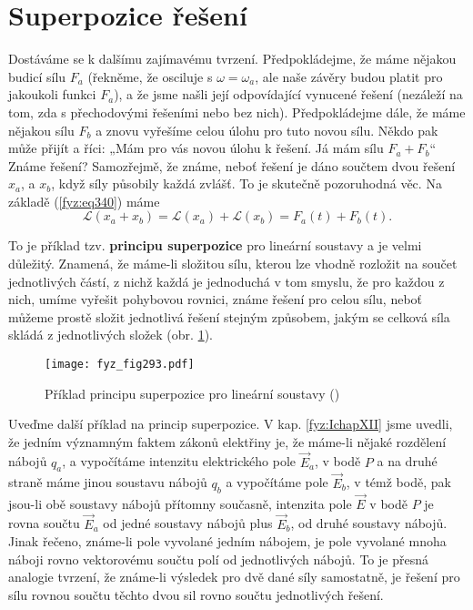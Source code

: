  \section{Superpozice řešení}\label{fyz:IchapXXVsecII}
    Dostáváme se k dalšímu zajímavému tvrzení. Předpokládejme, že máme nějakou budicí sílu \(F_a\) 
    (řekněme, že osciluje s \(\omega = \omega_a\), ale naše závěry budou platit pro jakoukoli 
    funkci \(F_a\)), a že jsme našli její odpovídající vynucené řešení (nezáleží na tom, zda s 
    přechodovými řešeními nebo bez nich). Předpokládejme dále, že máme nějakou sílu \(F_b\) a znovu 
    vyřešíme celou úlohu pro tuto novou sílu. Někdo pak může přijít a říci: „Mám pro vás novou 
    úlohu k řešení. Já mám sílu \(F_a + F_b\)“ Známe řešení? Samozřejmě, že známe, neboť řešení je 
    dáno součtem dvou řešení \(x_a\), a \(x_b\), když síly působily každá zvlášť. To je skutečně 
    pozoruhodná věc. Na základě (\ref{fyz:eq340}) máme
    \begin{equation}\label{fyz:eq345}
      \mathscr{L}(x_a + x_b) = \mathscr{L}(x_a) + \mathscr{L}(x_b) = F_a(t) + F_b(t).
    \end{equation}
    
    To je příklad tzv.\textbf{ principu superpozice} pro lineární soustavy a je velmi důležitý. 
    Znamená, že máme-li složitou sílu, kterou lze vhodně rozložit na součet jednotlivých částí, z 
    nichž každá je jednoduchá v tom smyslu, že pro každou z nich, umíme vyřešit pohybovou rovnici, 
    známe řešení pro celou sílu, neboť můžeme prostě složit jednotlivá řešení stejným způsobem, 
    jakým se celková síla skládá z jednotlivých složek (obr. \ref{fyz:fig293}).

    \begin{figure}[ht!] %
      \centering
      \texttt{[image: fyz\_fig293.pdf]}
      \caption{Příklad principu superpozice pro lineární soustavy
               (\cite[s.~334]{Feynman01})}
      \label{fyz:fig293}
    \end{figure}
    
    Uveďme další příklad na princip superpozice. V kap. \ref{fyz:IchapXII} jsme uvedli, že jedním 
    významným faktem zákonů elektřiny je, že máme-li nějaké rozdělení nábojů \(q_a\), a vypočítáme 
    intenzitu elektrického pole \(\vec{E}_a\), v bodě \(P\) a na druhé straně máme jinou soustavu 
    nábojů \(q_b\) a vypočítáme pole \(\vec{E}_b\), v témž bodě, pak jsou-li obě soustavy nábojů 
    přítomny současně, intenzita pole \(\vec{E}\) v bodě \(P\) je rovna součtu \(\vec{E}_a\) od 
    jedné soustavy nábojů plus \(\vec{E}_b\), od druhé soustavy nábojů. Jinak řečeno, známe-li pole 
    vyvolané jedním nábojem, je pole vyvolané mnoha náboji rovno vektorovému součtu polí od 
    jednotlivých nábojů. To je přesná analogie tvrzení, že známe-li výsledek pro dvě dané síly 
    samostatně, je řešení pro sílu rovnou součtu těchto dvou sil rovno součtu jednotlivých řešení.
    
